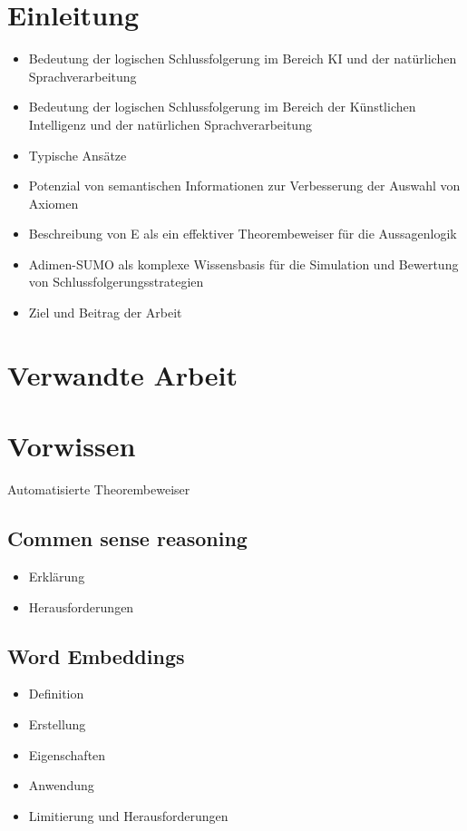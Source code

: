 \documentclass[german,version-2020-11]{uzl-thesis}
\begin{document}
%
%


\chapter{Einleitung}
\begin{itemize}
  \item Bedeutung der logischen Schlussfolgerung im Bereich KI und der natürlichen Sprachverarbeitung
  \item Bedeutung der logischen Schlussfolgerung im Bereich der Künstlichen Intelligenz und der natürlichen Sprachverarbeitung
  \item Typische Ansätze
  \item Potenzial von semantischen Informationen zur Verbesserung der Auswahl von Axiomen
  \item Beschreibung von E als ein effektiver Theorembeweiser für die Aussagenlogik
  \item Adimen-SUMO als komplexe Wissensbasis für die Simulation und Bewertung von Schlussfolgerungsstrategien
  \item Ziel und Beitrag der Arbeit
\end{itemize}
\chapter{Verwandte Arbeit}
%
\chapter{Vorwissen}
Automatisierte Theorembeweiser
\section{Commen sense reasoning}
\begin{itemize}
  \item Erklärung
  \item Herausforderungen
\end{itemize}
\section{Word Embeddings}
\begin{itemize}
  \item Definition
  \item Erstellung
  \item Eigenschaften
  \item Anwendung
  \item Limitierung und Herausforderungen
\end{itemize}
\end{document}
